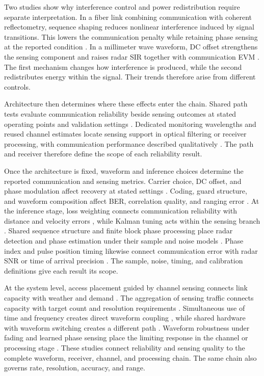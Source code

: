 Two studies show why interference control and power redistribution require
separate interpretation. In a fiber link combining communication with coherent
reflectometry, sequence shaping reduces nonlinear interference induced by
signal transitions. This lowers the communication penalty while retaining
phase sensing at the reported condition \cite{OISAC_SCR00052}. In a millimeter
wave waveform, DC offset strengthens the sensing component and raises radar SIR together with
communication EVM \cite{OISAC_SCR00808}. The first mechanism changes how
interference is produced, while the second redistributes energy within the
signal. Their trends therefore arise from different controls.

Architecture then determines where these effects enter the chain. Shared path
tests evaluate communication reliability beside sensing outcomes at stated
operating points and validation settings
\cite{OISAC_SCR00008,OISAC_SCR00056,OISAC_SCR00589,OISAC_SCR00680}. Dedicated
monitoring wavelengths and reused channel estimates locate sensing support in
optical filtering or receiver processing, with communication performance
described qualitatively \cite{OISAC_SCR00957,OISAC_SCR00959}. The path and
receiver therefore define the scope of each reliability result.

Once the architecture is fixed, waveform and inference choices determine the
reported communication and sensing metrics. Carrier choice, DC offset, and phase
modulation affect recovery at stated settings
\cite{OISAC_SCR00160,OISAC_SCR00312,OISAC_SCR00602}. Coding, guard structure,
and waveform composition affect BER, correlation quality, and ranging error
\cite{OISAC_SCR00885,OISAC_SCR00902,OISAC_SCR00918}. At the
inference stage, loss weighting connects communication reliability with
distance and velocity errors \cite{OISAC_SCR00233}, while Kalman tuning acts
within the sensing branch \cite{OISAC_SCR00665}. Shared sequence structure and
finite block phase processing place radar detection and phase estimation under
their sample and noise models \cite{OISAC_SCR00719,OISAC_SCR00906}. Phase index
and pulse position timing likewise connect communication error with radar SNR
or time of arrival precision \cite{OISAC_SCR00937,OISAC_SCR00979}. The sample,
noise, timing, and calibration definitions give each result its scope.

At the system level, access placement guided by channel sensing connects link
capacity with weather and demand \cite{OISAC_SCR00922}. The aggregation of
sensing traffic connects capacity with target count and resolution requirements
\cite{OISAC_SCR01049}. Simultaneous use of time and frequency
creates direct waveform coupling \cite{OISAC_SCR00978}, while shared hardware
with waveform switching creates a different path
\cite{OISAC_SCR01041}. Waveform robustness under fading and learned phase
sensing place the limiting response in the channel or processing stage
\cite{OISAC_SCR00993,OISAC_SCR01185}. These studies connect reliability and
sensing quality to the complete waveform, receiver, channel, and processing
chain. The same chain also governs rate, resolution, accuracy, and range.

